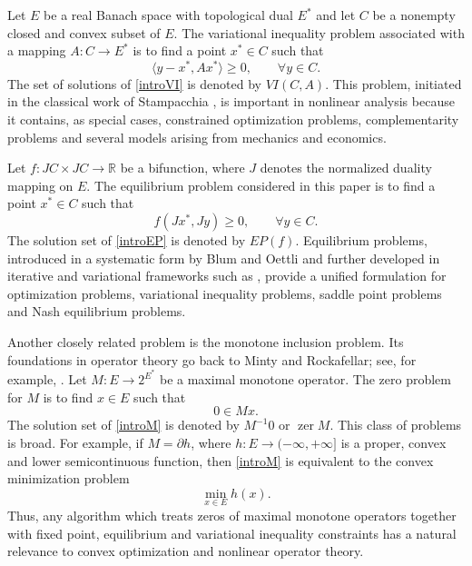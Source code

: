 \documentclass[leqno,12pt]{amsart}
\theoremstyle{definition}
\numberwithin{equation}{section}
\begin{document}
Let $E$ be a real Banach space with topological dual $E^{*}$ and let $C$ be a nonempty closed and convex subset of $E$. The variational inequality problem associated with a mapping $A:C\to E^{*}$ is to find a point $x^{*}\in C$ such that
\begin{equation}\label{introVI}
\langle y-x^{*},Ax^{*}\rangle\geq 0,\qquad \forall y\in C.
\end{equation}
The set of solutions of \eqref{introVI} is denoted by $VI(C,A)$. This problem, initiated in the classical work of Stampacchia \cite{Stampacchia1964}, is important in nonlinear analysis because it contains, as special cases, constrained optimization problems, complementarity problems and several models arising from mechanics and economics.

Let $f:JC\times JC\to \mathbb{R}$ be a bifunction, where $J$ denotes the normalized duality mapping on $E$. The equilibrium problem considered in this paper is to find a point $x^{*}\in C$ such that
\begin{equation}\label{introEP}
f(Jx^{*},Jy)\geq 0,\qquad \forall y\in C.
\end{equation}
The solution set of \eqref{introEP} is denoted by $EP(f)$. Equilibrium problems, introduced in a systematic form by Blum and Oettli \cite{BlumOettli1994} and further developed in iterative and variational frameworks such as \cite{CombettesHirstoaga2005}, provide a unified formulation for optimization problems, variational inequality problems, saddle point problems and Nash equilibrium problems.

Another closely related problem is the monotone inclusion problem. Its foundations in operator theory go back to Minty and Rockafellar; see, for example, \cite{Minty1962,Rockafellar1970}. Let $M:E\to 2^{E^{*}}$ be a maximal monotone operator. The zero problem for $M$ is to find $x\in E$ such that
\begin{equation}\label{introM}
0\in Mx.
\end{equation}
The solution set of \eqref{introM} is denoted by $M^{-1}0$ or $\operatorname{zer}M$. This class of problems is broad. For example, if $M=\partial h$, where $h:E\to (-\infty,+\infty]$ is a proper, convex and lower semicontinuous function, then \eqref{introM} is equivalent to the convex minimization problem
\[
\min_{x\in E}h(x).
\]
Thus, any algorithm which treats zeros of maximal monotone operators together with fixed point, equilibrium and variational inequality constraints has a natural relevance to convex optimization and nonlinear operator theory.
\end{document}
